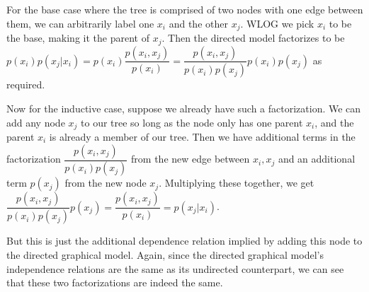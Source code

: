 \documentclass{article}
\begin{document}
For the base case where the tree is comprised of two nodes with one edge between them, we can arbitrarily label one $x_i$ and the other $x_j$. WLOG we pick $x_i$ to be the base, making it the parent of $x_j$. Then the directed model factorizes to be $p(x_i)p(x_j|x_i) = p(x_i)\dfrac{p(x_i, x_j)}{p(x_i)} = \dfrac{p(x_i, x_j)}{p(x_i)p(x_j)}p(x_i)p(x_j)$ as required. 

Now for the inductive case, suppose we already have such a factorization. We can add any node $x_j$ to our tree so long as the node only has one parent $x_i$, and the parent $x_i$ is already a member of our tree. Then we have additional terms in the factorization $\dfrac{p(x_i, x_j)}{p(x_i)p(x_j)}$ from the new edge between $x_i, x_j$ and an additional term $p(x_j)$ from the new node $x_j$. Multiplying these together, we get $\dfrac{p(x_i, x_j)}{p(x_i)p(x_j)}p(x_j) = \dfrac{p(x_i, x_j)}{p(x_i)} = p(x_j|x_i)$. 

But this is just the additional dependence relation implied by adding this node to the directed graphical model. Again, since the directed graphical model's independence relations are the same as its undirected counterpart, we can see that these two factorizations are indeed the same.
\end{document}
